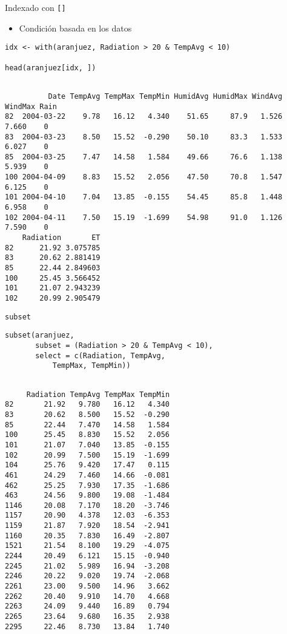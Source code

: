 \documentclass[xcolor={usenames,svgnames,dvipsnames}]{beamer}
\begin{document}
\begin{frame}[label={sec:orgabf44d7},fragile]{Indexado con \texttt{[]}}
 \begin{itemize}
\item Condición basada en los datos
\end{itemize}
\lstset{language=r,label= ,caption= ,captionpos=b,numbers=none}
\begin{lstlisting}
idx <- with(aranjuez, Radiation > 20 & TempAvg < 10) 

head(aranjuez[idx, ])
\end{lstlisting}

\begin{verbatim}

          Date TempAvg TempMax TempMin HumidAvg HumidMax WindAvg WindMax Rain
82  2004-03-22    9.78   16.12   4.340    51.65     87.9   1.526   7.660    0
83  2004-03-23    8.50   15.52  -0.290    50.10     83.3   1.533   6.027    0
85  2004-03-25    7.47   14.58   1.584    49.66     76.6   1.138   5.939    0
100 2004-04-09    8.83   15.52   2.056    47.50     70.8   1.547   6.125    0
101 2004-04-10    7.04   13.85  -0.155    54.45     85.8   1.448   6.958    0
102 2004-04-11    7.50   15.19  -1.699    54.98     91.0   1.126   7.590    0
    Radiation       ET
82      21.92 3.075785
83      20.62 2.881419
85      22.44 2.849603
100     25.45 3.566452
101     21.07 2.943239
102     20.99 2.905479
\end{verbatim}
\end{frame}

\begin{frame}[label={sec:org70d8ff7},fragile]{\texttt{subset}}
 \lstset{language=r,label= ,caption= ,captionpos=b,numbers=none}
\begin{lstlisting}
subset(aranjuez,
       subset = (Radiation > 20 & TempAvg < 10),
       select = c(Radiation, TempAvg,
           TempMax, TempMin))
\end{lstlisting}

\begin{verbatim}

     Radiation TempAvg TempMax TempMin
82       21.92   9.780   16.12   4.340
83       20.62   8.500   15.52  -0.290
85       22.44   7.470   14.58   1.584
100      25.45   8.830   15.52   2.056
101      21.07   7.040   13.85  -0.155
102      20.99   7.500   15.19  -1.699
104      25.76   9.420   17.47   0.115
461      24.29   7.460   14.66  -0.081
462      25.25   7.930   17.35  -1.686
463      24.56   9.800   19.08  -1.484
1146     20.08   7.170   18.20  -3.746
1157     20.90   4.378   12.03  -6.353
1159     21.87   7.920   18.54  -2.941
1160     20.35   7.830   16.49  -2.807
1521     21.54   8.100   19.29  -4.075
2244     20.49   6.121   15.15  -0.940
2245     21.02   5.989   16.94  -3.208
2246     20.22   9.020   19.74  -2.068
2261     23.00   9.500   14.96   3.662
2262     20.40   9.910   14.70   4.668
2263     24.09   9.440   16.89   0.794
2265     23.64   9.680   16.35   2.938
2295     22.46   8.730   13.84   1.740
\end{verbatim}
\end{frame}
\end{document}
